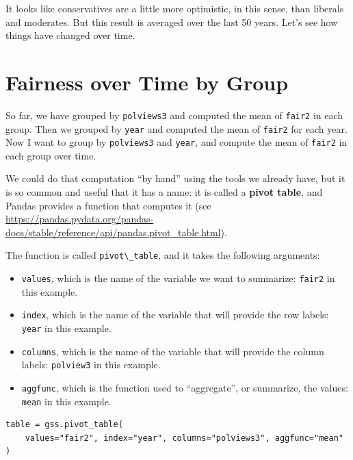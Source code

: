 It looks like conservatives are a little more optimistic, in this sense,
than liberals and moderates. But this result is averaged over the last
50 years. Let's see how things have changed over time.

\hypertarget{fairness-over-time-by-group}{%
\section{Fairness over Time by
Group}\label{fairness-over-time-by-group}}

So far, we have grouped by \passthrough{\lstinline!polviews3!} and
computed the mean of \passthrough{\lstinline!fair2!} in each group. Then
we grouped by \passthrough{\lstinline!year!} and computed the mean of
\passthrough{\lstinline!fair2!} for each year. Now I want to group by
\passthrough{\lstinline!polviews3!} and \passthrough{\lstinline!year!},
and compute the mean of \passthrough{\lstinline!fair2!} in each group
over time.

We could do that computation ``by hand'' using the tools we already
have, but it is so common and useful that it has a name: it is called a
\textbf{pivot table}, and Pandas provides a function that computes it
(see
\url{https://pandas.pydata.org/pandas-docs/stable/reference/api/pandas.pivot_table.html}).

The function is called \passthrough{\lstinline!pivot\_table!}, and it
takes the following arguments:

\begin{itemize}
\item
  \passthrough{\lstinline!values!}, which is the name of the variable we
  want to summarize: \passthrough{\lstinline!fair2!} in this example.
\item
  \passthrough{\lstinline!index!}, which is the name of the variable
  that will provide the row labels: \passthrough{\lstinline!year!} in
  this example.
\item
  \passthrough{\lstinline!columns!}, which is the name of the variable
  that will provide the column labels:
  \passthrough{\lstinline!polview3!} in this example.
\item
  \passthrough{\lstinline!aggfunc!}, which is the function used to
  ``aggregate'', or summarize, the values:
  \passthrough{\lstinline!mean!} in this example.
\end{itemize}

\begin{lstlisting}[]
table = gss.pivot_table(
    values="fair2", index="year", columns="polviews3", aggfunc="mean"
)
\end{lstlisting}

